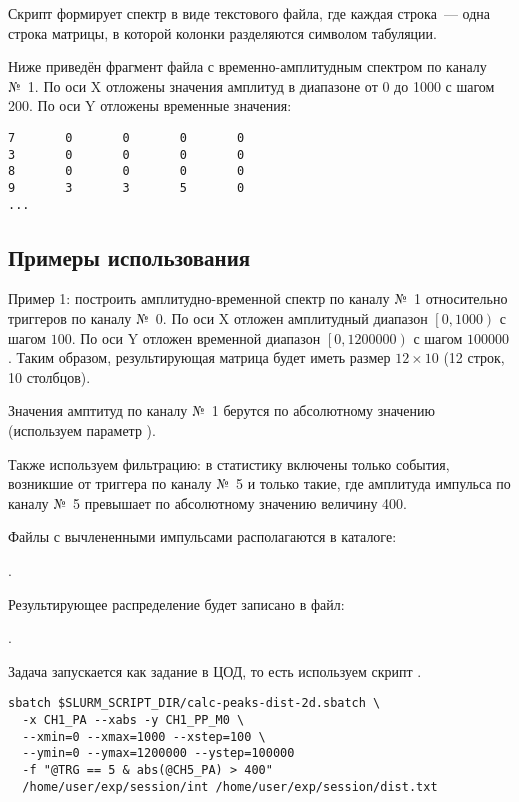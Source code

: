 Скрипт формирует спектр в виде текстового файла, где каждая строка~--- одна строка матрицы, в которой колонки разделяются символом табуляции.

Ниже приведён фрагмент файла с временно-амплитудным спектром по каналу №~1. По оси X отложены значения амплитуд в диапазоне от 0 до 1000 с шагом 200. По оси Y отложены временные значения:

\begin{lstlisting}
7       0       0       0       0
3       0       0       0       0
8       0       0       0       0
9       3       3       5       0
...
\end{lstlisting}

\subsection{Примеры использования}

Пример 1: построить амплитудно-временной спектр по каналу №~1 относительно триггеров по каналу №~0. По оси X отложен амплитудный диапазон $\left[0, 1000\right)$ с шагом $100$. По оси Y отложен временной диапазон $\left[0, 1200000\right)$ с шагом $100000$. Таким образом, результирующая матрица будет иметь размер $12 \times 10$ (12 строк, 10 столбцов).

Значения амптитуд по каналу №~1 берутся по абсолютному значению (используем параметр ).

Также используем фильтрацию: в статистику включены только события, возникшие от триггера по каналу №~5 и только такие, где амплитуда импульса по каналу №~5 превышает по абсолютному значению величину 400.

Файлы с вычлененными импульсами располагаются в каталоге:

 . 

Результирующее распределение будет записано в файл:

 .

Задача запускается как задание в ЦОД, то есть используем скрипт .

\begin{lstlisting}
sbatch $SLURM_SCRIPT_DIR/calc-peaks-dist-2d.sbatch \
  -x CH1_PA --xabs -y CH1_PP_M0 \
  --xmin=0 --xmax=1000 --xstep=100 \
  --ymin=0 --ymax=1200000 --ystep=100000 
  -f "@TRG == 5 & abs(@CH5_PA) > 400"
  /home/user/exp/session/int /home/user/exp/session/dist.txt
\end{lstlisting}
